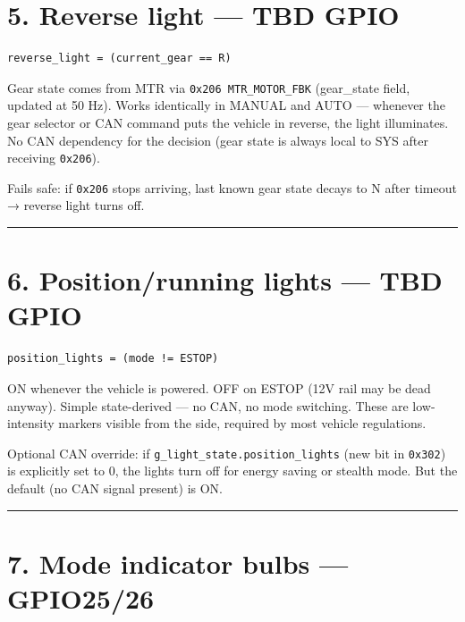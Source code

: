 \documentclass[12pt,a4paper,oneside]{report}
\begin{document}
\section{5. Reverse light --- TBD GPIO}\label{reverse-light-tbd-gpio}

\begin{verbatim}
reverse_light = (current_gear == R)
\end{verbatim}

Gear state comes from MTR via \texttt{0x206\ MTR\_MOTOR\_FBK} (gear\_state
field, updated at 50 Hz). Works identically in MANUAL and AUTO --- whenever the
gear selector or CAN command puts the vehicle in reverse, the light illuminates.
No CAN dependency for the decision (gear state is always local to SYS after
receiving \texttt{0x206}).

Fails safe: if \texttt{0x206} stops arriving, last known gear state decays to N
after timeout → reverse light turns off.

\begin{center}\rule{0.5\linewidth}{0.5pt}\end{center}

\section{6. Position/running lights --- TBD
GPIO}\label{positionrunning-lights-tbd-gpio}

\begin{verbatim}
position_lights = (mode != ESTOP)
\end{verbatim}

ON whenever the vehicle is powered. OFF on ESTOP (12V rail may be dead anyway).
Simple state-derived --- no CAN, no mode switching. These are low-intensity
markers visible from the side, required by most vehicle regulations.

Optional CAN override: if \texttt{g\_light\_state.position\_lights} (new bit in
\texttt{0x302}) is explicitly set to 0, the lights turn off for energy saving or
stealth mode. But the default (no CAN signal present) is ON.

\begin{center}\rule{0.5\linewidth}{0.5pt}\end{center}

\section{7. Mode indicator bulbs ---
GPIO25/26}\label{mode-indicator-bulbs-gpio2526}
\end{document}
